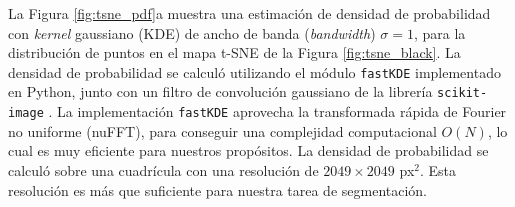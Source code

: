 La Figura \ref{fig:tsne_pdf}a muestra una estimación de densidad de probabilidad con \textit{kernel} gaussiano (KDE) de ancho de banda (\textit{bandwidth}) $\sigma=1$, para la distribución de puntos en el mapa t-SNE de la Figura \ref{fig:tsne_black}. La densidad de probabilidad se calculó utilizando el módulo \texttt{fastKDE} \cite{obrien_fastkde} implementado en Python, junto con un filtro de convolución gaussiano de la librería \texttt{scikit-image} \cite{scikit-image}. La implementación \texttt{fastKDE} aprovecha la transformada rápida de Fourier no uniforme (nuFFT), para conseguir una complejidad computacional $O(N)$, lo cual es muy eficiente para nuestros propósitos. La densidad de probabilidad se calculó sobre una cuadrícula con una resolución de $2049 \times 2049$ px$^2$. Esta resolución es más que suficiente para nuestra tarea de segmentación.

